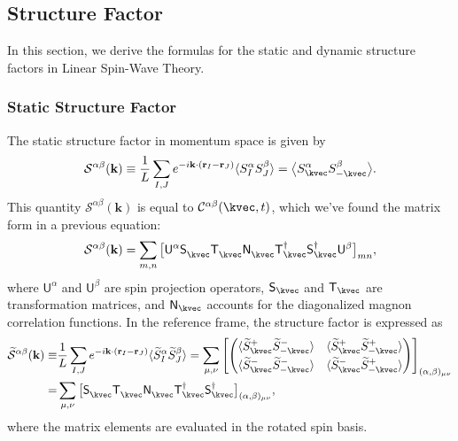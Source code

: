 \subsection{Structure Factor}\label{subsec: Structure Factor}

In this section, we derive the formulas for the static and dynamic structure factors in Linear Spin-Wave Theory.

\subsubsection{Static Structure Factor}

The static structure factor in momentum space is given by
\begin{equation}
    \mathcal{S}^{\alpha\beta} (\mathbf{k}) 
    \equiv \frac{1}{L} 
    \sum_{I, J}
    e^{- i \mathbf{k} \cdot ( \mathbf{r}_{I} -  \mathbf{r}_{J} ) }
    \langle 
    S_{I}^{\alpha}
    S_{J}^{\beta} 
    \rangle 
    = \big\langle S^{\alpha}_{\kvec} S^{\beta}_{-\kvec} \big\rangle.
\end{equation}
This quantity $\mathcal{S}^{\alpha\beta} (\mathbf{k})$ is equal to $\mathcal{C}^{\alpha\beta}(\kvec, t)$, which we've found the matrix form in a previous equation:
\begin{equation}
    \mathcal{S}^{\alpha\beta} (\mathbf{k}) = 
    \sum_{m,n} 
    \big[ \mathsf{U}^{\alpha} 
    \mathsf{S}_{\kvec}^{\phantom \dagger} 
    \mathsf{T}_{\kvec}^{\phantom \dagger} 
    \mathsf{N}_{\kvec}^{\phantom \dagger}
    \mathsf{T}_{\kvec}^{         \dagger}
    \mathsf{S}_{\kvec}^{         \dagger}
    \mathsf{U}^{\beta} \big]_{mn},
\end{equation}
where $\mathsf{U}^{\alpha}$ and $\mathsf{U}^{\beta}$ are spin projection operators, $\mathsf{S}_{\kvec}$ and $\mathsf{T}_{\kvec}$ are transformation matrices, and $\mathsf{N}_{\kvec}$ accounts for the diagonalized magnon correlation functions.
In the reference frame, the structure factor is expressed as
\begin{align*}
    \widetilde{\mathcal{S}}^{\alpha\beta} (\mathbf{k}) 
    \equiv &
    \frac{1}{L} 
    \sum_{I, J}
    e^{- i \mathbf{k} \cdot ( \mathbf{r}_{I} -  \mathbf{r}_{J} ) }
    \langle \widetilde{S}_{I}^{\alpha} \widetilde{S}_{J}^{\beta} \rangle 
    = 
    \sum_{\mu, \nu} 
    \left[
    \begin{pmatrix}
        \langle \widetilde{S}^{+}_{\kvec} \widetilde{S}^{-}_{-\kvec} \rangle &
        \langle \widetilde{S}^{+}_{\kvec} \widetilde{S}^{+}_{-\kvec} \rangle \\[0.25em]
        \langle \widetilde{S}^{-}_{\kvec} \widetilde{S}^{-}_{-\kvec} \rangle &
        \langle \widetilde{S}^{-}_{\kvec} \widetilde{S}^{+}_{-\kvec} \rangle
    \end{pmatrix} 
    \right]_{(\alpha, \beta)_{\mu\nu}}
    \\ = &
    \sum_{\mu, \nu} 
    \big[
    \mathsf{S}_{\kvec}^{\phantom \dagger} 
    \mathsf{T}_{\kvec}^{\phantom \dagger} 
    \mathsf{N}_{\kvec}^{\phantom \dagger}  
    \mathsf{T}_{\kvec}^{         \dagger}
    \mathsf{S}_{\kvec}^{         \dagger}
    \big]_{(\alpha, \beta)_{\mu\nu}},
\end{align*}
where the matrix elements are evaluated in the rotated spin basis.

